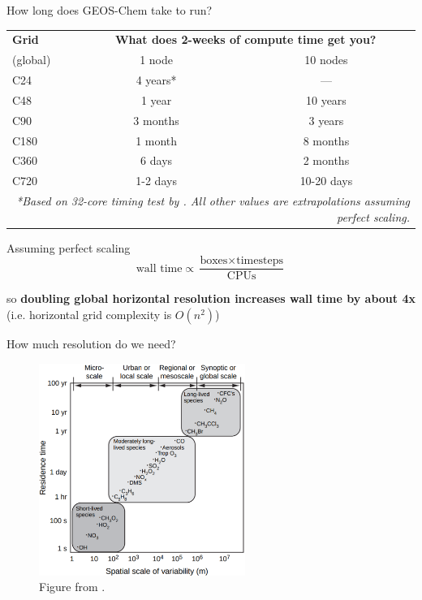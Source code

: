 \documentclass[10pt]{beamer}
\newcommand{\semitransp}[2][35]{\color{fg!#1}#2}
\begin{document}
\begin{frame}[fragile]{How long does GEOS-Chem take to run?}
    \small
    \begin{table}[]
    \begin{tabular}{lcc}
        \hline
        \textbf{Grid} & \multicolumn{2}{c}{\textbf{What does 2-weeks of compute time get you?}} \\ 
        (global) & 1 node & 10 nodes \\ 
        \hline
        C24 & 4 years* & --- \\ 
        C48 & 1 year &  10 years \\ 
        C90 & \semitransp[60]{3 months} & 3 years \\ 
        C180 & \semitransp[60]{1 month} & 8 months \\ 
        C360 & \semitransp[60]{6 days} & 2 months \\ 
        \semitransp[60]{C720} & \semitransp[60]{1-2 days} & \semitransp[60]{10-20 days} \\ \hline
        \multicolumn{3}{r}{\fontsize{4}{4}\selectfont\textit{*Based on 32-core timing test by \cite{yantosca_timing_2018}. All other values are extrapolations assuming perfect scaling.}} \\ 
    \end{tabular}
    \end{table}
    
    \pause
    
    Assuming perfect scaling
    $$\text{wall time} \propto \frac{\text{boxes} \times \text{timesteps}}{\text{CPUs}}$$
    
    so \textbf{doubling global horizontal resolution increases wall time by about 4x} (i.e. horizontal grid complexity is $O(n^2)$)    
\end{frame}

\begin{frame}[fragile]{How much resolution do we need?}
    \begin{figure}
        \centering
        \includegraphics[width=0.6\textwidth]{species-scale-1.eps}
        \captionsetup{labelformat=empty}
        \caption{Figure from \cite{wallace_atmospheric_2006}.}
    \end{figure}
\end{frame}
\end{document}
